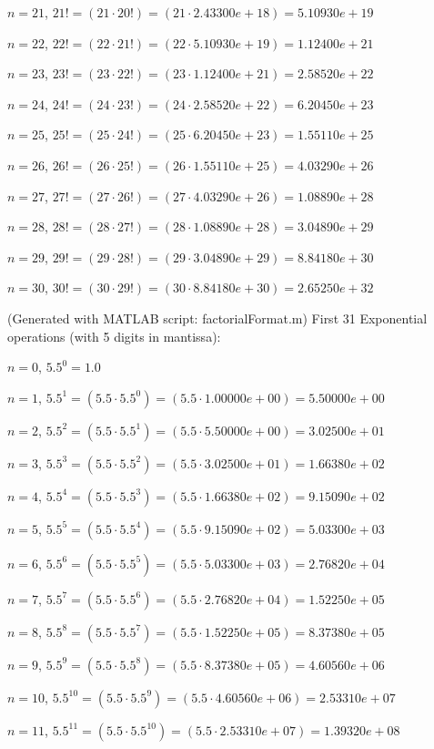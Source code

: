 \documentclass[12pt]{article}
\begin{document}
$n = 21$, $21! = (21 \cdot 20!) = (21 \cdot 2.43300e+18) = 5.10930e+19$

$n = 22$, $22! = (22 \cdot 21!) = (22 \cdot 5.10930e+19) = 1.12400e+21$

$n = 23$, $23! = (23 \cdot 22!) = (23 \cdot 1.12400e+21) = 2.58520e+22$

$n = 24$, $24! = (24 \cdot 23!) = (24 \cdot 2.58520e+22) = 6.20450e+23$

$n = 25$, $25! = (25 \cdot 24!) = (25 \cdot 6.20450e+23) = 1.55110e+25$

$n = 26$, $26! = (26 \cdot 25!) = (26 \cdot 1.55110e+25) = 4.03290e+26$

$n = 27$, $27! = (27 \cdot 26!) = (27 \cdot 4.03290e+26) = 1.08890e+28$

$n = 28$, $28! = (28 \cdot 27!) = (28 \cdot 1.08890e+28) = 3.04890e+29$

$n = 29$, $29! = (29 \cdot 28!) = (29 \cdot 3.04890e+29) = 8.84180e+30$

$n = 30$, $30! = (30 \cdot 29!) = (30 \cdot 8.84180e+30) = 2.65250e+32$

(Generated with MATLAB script: factorialFormat.m)
\newpage
First 31 Exponential operations (with 5 digits in mantissa):

$n = 0$, $5.5^{0} = 1.0$

$n = 1$, $5.5^{1} = (5.5 \cdot 5.5^{0}) = (5.5 \cdot 1.00000e+00) = 5.50000e+00$

$n = 2$, $5.5^{2} = (5.5 \cdot 5.5^{1}) = (5.5 \cdot 5.50000e+00) = 3.02500e+01$

$n = 3$, $5.5^{3} = (5.5 \cdot 5.5^{2}) = (5.5 \cdot 3.02500e+01) = 1.66380e+02$

$n = 4$, $5.5^{4} = (5.5 \cdot 5.5^{3}) = (5.5 \cdot 1.66380e+02) = 9.15090e+02$

$n = 5$, $5.5^{5} = (5.5 \cdot 5.5^{4}) = (5.5 \cdot 9.15090e+02) = 5.03300e+03$

$n = 6$, $5.5^{6} = (5.5 \cdot 5.5^{5}) = (5.5 \cdot 5.03300e+03) = 2.76820e+04$

$n = 7$, $5.5^{7} = (5.5 \cdot 5.5^{6}) = (5.5 \cdot 2.76820e+04) = 1.52250e+05$

$n = 8$, $5.5^{8} = (5.5 \cdot 5.5^{7}) = (5.5 \cdot 1.52250e+05) = 8.37380e+05$

$n = 9$, $5.5^{9} = (5.5 \cdot 5.5^{8}) = (5.5 \cdot 8.37380e+05) = 4.60560e+06$

$n = 10$, $5.5^{10} = (5.5 \cdot 5.5^{9}) = (5.5 \cdot 4.60560e+06) = 2.53310e+07$

$n = 11$, $5.5^{11} = (5.5 \cdot 5.5^{10}) = (5.5 \cdot 2.53310e+07) = 1.39320e+08$
\end{document}

